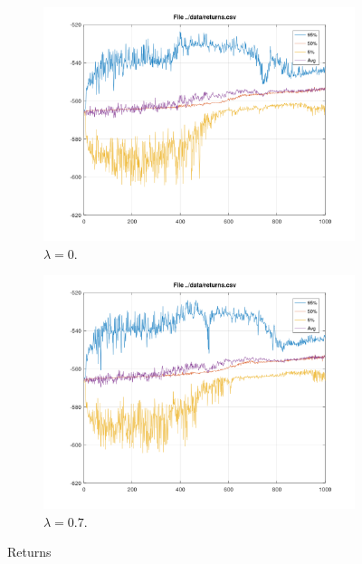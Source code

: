 \documentclass[a4paper,11pt]{article}
\begin{document}
\begin{figure}[h!]
	\centering
	\begin{subfigure}[b]{0.4\linewidth}
		\includegraphics[width=\linewidth]{returns-0.png}
		\caption{$\lambda=0$.}
	\end{subfigure}
	\begin{subfigure}[b]{0.4\linewidth}
		\includegraphics[width=\linewidth]{returns-07.png}
		\caption{$\lambda=0.7$.}
	\end{subfigure}
	\caption{Returns}
	\label{fig:returns}
\end{figure}
\end{document}
